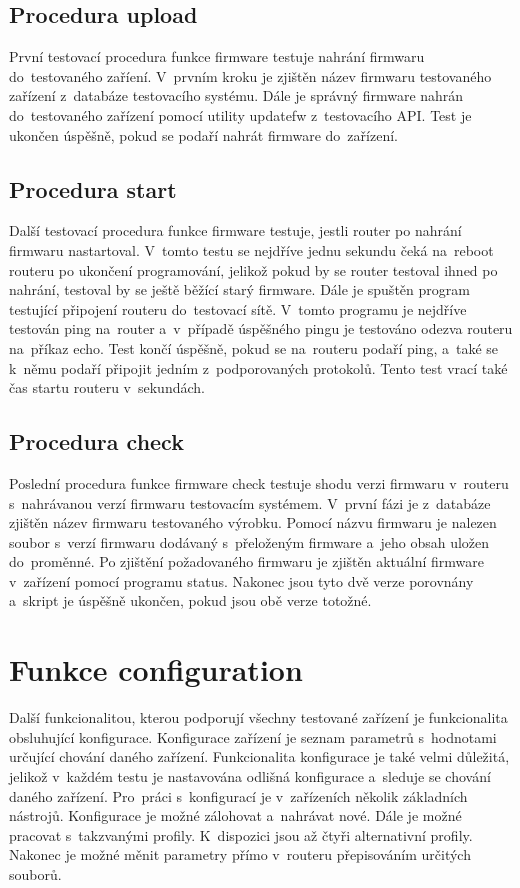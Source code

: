 \subsection{Procedura upload}
První testovací procedura funkce firmware testuje nahrání firmwaru do~testovaného zaříení. V~prvním kroku je zjištěn název firmwaru testovaného zařízení z~databáze testovacího systému. Dále je správný firmware nahrán do~testovaného zařízení pomocí utility updatefw z~testovacího API. Test je ukončen úspěšně, pokud se podaří nahrát firmware do~zařízení.

\subsection{Procedura start}
Další testovací procedura funkce firmware testuje, jestli router po nahrání firmwaru nastartoval. V~tomto testu se nejdříve jednu sekundu čeká na~reboot routeru po ukončení programování, jelikož pokud by se router testoval ihned po nahrání, testoval by se ještě běžící starý firmware. Dále je spuštěn program testující připojení routeru do~testovací sítě. V~tomto programu je nejdříve testován ping na~router a~v~případě úspěšného pingu je testováno odezva routeru na~příkaz echo. Test končí úspěšně, pokud se na~routeru podaří ping, a~také se k~němu podaří připojit jedním z~podporovaných protokolů. Tento test vrací také čas startu routeru v~sekundách.

\subsection{Procedura check}
Poslední procedura funkce firmware check testuje shodu verzi firmwaru v~routeru s~nahrávanou verzí firmwaru testovacím systémem. V~první fázi je z~databáze zjištěn název firmwaru testovaného výrobku. Pomocí názvu firmwaru je nalezen soubor s~verzí firmwaru dodávaný s~přeloženým firmware a~jeho obsah uložen do~proměnné. Po zjištění požadovaného firmwaru je zjištěn aktuální firmware v~zařízení pomocí programu status. Nakonec jsou tyto dvě verze porovnány a~skript je úspěšně ukončen, pokud jsou obě verze totožné.

\section{Funkce configuration}
Další funkcionalitou, kterou podporují všechny testované zařízení je funkcionalita obsluhující konfigurace. Konfigurace zařízení je seznam parametrů s~hodnotami určující chování daného zařízení. Funkcionalita konfigurace je také velmi důležitá, jelikož v~každém testu je nastavována odlišná konfigurace a~sleduje se chování daného zařízení. Pro~práci s~konfigurací je v~zařízeních několik základních nástrojů. Konfigurace je možné zálohovat a~nahrávat nové. Dále je možné pracovat s~takzvanými profily. K~dispozici jsou až čtyři alternativní profily. Nakonec je možné měnit parametry přímo v~routeru přepisováním určitých souborů.

